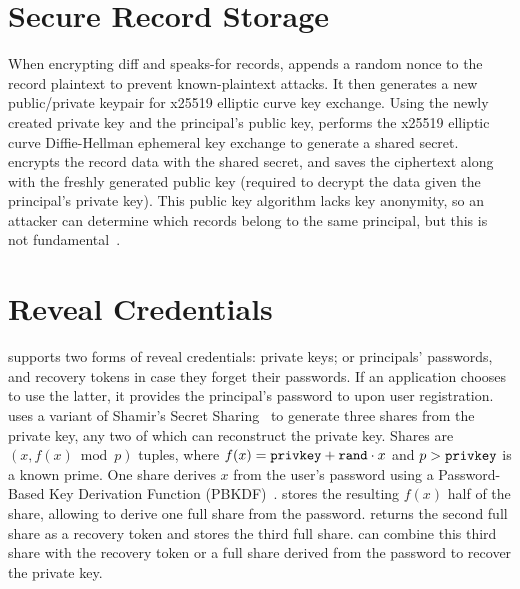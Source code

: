 \section{Secure Record Storage}
%
When encrypting diff and speaks-for records, \sys appends a random nonce to
the record plaintext to prevent known-plaintext attacks.
%
It then generates a new public/private keypair for x25519 elliptic curve key
exchange.
%
Using the newly created private key and the principal's public key, \sys
performs the x25519 elliptic curve Diffie-Hellman ephemeral key exchange to
generate a shared secret.
%
\sys encrypts the record data with the shared secret, and saves the
ciphertext along with the freshly generated public key (required to decrypt
the data given the principal's private key).
%
This public key algorithm lacks key anonymity, so an attacker can determine
which records belong to the same principal, but this is not
fundamental~\cite{anonymous-keys}.

%

\section{Reveal Credentials}
%
\sys supports two forms of reveal credentials: \one{} private keys; or
\two{} principals' passwords, and recovery
tokens in case they forget their passwords.
%
If an application chooses to use the latter, it provides the principal's password
to \sys upon user registration.
%
\sys uses a variant of Shamir's Secret Sharing~\cite{secretsharing}
to generate three shares from the private key, any two of which can reconstruct the
private key.
%
Shares are $(x, f(x) \bmod p)$ tuples, where $f(x) = \texttt{{privkey}} + \texttt{{rand}} \cdot
x$ and $p > \texttt{{privkey}}$ is a known prime.
%
One share derives $x$ from the user's password using a Password-Based Key
Derivation Function (PBKDF)~\cite{pbkdf-rfc}.
%
\sys stores the resulting $f(x)$ half of the share, allowing \sys to derive one
full share from the password.
%
%
\sys returns the second full share as a recovery token and stores the third full
share.
%
\sys can combine this third share with the recovery token
or a full share derived from the password to recover the
private key.
%

